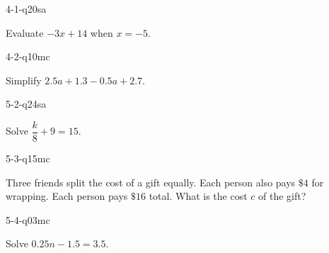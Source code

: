 \begin{practiceQuestion}{4-1-q20}{sa}
\begin{questionText}
Evaluate $-3x + 14$ when $x = -5$.
\end{questionText}
\end{practiceQuestion}

\begin{practiceQuestion}{4-2-q10}{mc}
\begin{questionText}
Simplify $2.5a + 1.3 - 0.5a + 2.7$.
\end{questionText}
\end{practiceQuestion}

\begin{practiceQuestion}{5-2-q24}{sa}
\begin{questionText}
Solve $\dfrac{k}{8} + 9 = 15$.
\end{questionText}
\end{practiceQuestion}

\begin{practiceQuestion}{5-3-q15}{mc}
\begin{questionText}
Three friends split the cost of a gift equally. Each person also pays $\$4$ for wrapping. Each person pays $\$16$ total. What is the cost $c$ of the gift?
\end{questionText}
\end{practiceQuestion}

\begin{practiceQuestion}{5-4-q03}{mc}
\begin{questionText}
Solve $0.25n - 1.5 = 3.5$.
\end{questionText}
\end{practiceQuestion}


